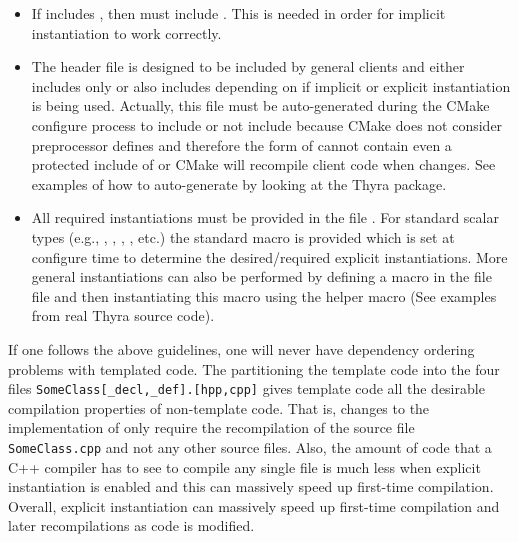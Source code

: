 \begin{itemize}
\begin{itemize}
\item If  includes
  , then  must
  include .  This is needed in order for
  implicit instantiation to work correctly.

\item The header file  is designed to be included
  by general clients and either includes only
   or also includes 
  depending on if implicit or explicit instantiation is being used.
  Actually, this file must be auto-generated during the CMake configure
  process to include or not include  because
  CMake does not consider preprocessor defines and therefore the form
  of  cannot contain even a protected include of
   or CMake will recompile client code when
   changes.  See examples of how to
  auto-generate  by looking at the Thyra package.

\item All required instantiations must be provided in the file
  .  For standard scalar types (e.g., ,
  , , ,
  etc.) the standard macro
   is
  provided which is set at configure time to determine the
  desired/required explicit instantiations.  More general
  instantiations can also be performed by defining a macro in the file
   file and then instantiating this macro
  using the helper macro
   (See
  examples from real Thyra source code).

\end{itemize}

If one follows the above guidelines, one will never have dependency
ordering problems with templated code.  The partitioning the template
code into the four files \texttt{SomeClass[\_decl,\_def].[hpp,cpp]}
gives template code all the desirable compilation properties of
non-template code.  That is, changes to the implementation of
 only require the recompilation of the source file
\texttt{SomeClass.cpp} and not any other source files.  Also, the
amount of code that a C++ compiler has to see to compile any single
 file is much less when explicit instantiation is enabled
and this can massively speed up first-time compilation.  Overall,
explicit instantiation can massively speed up first-time compilation
and later recompilations as code is modified.


\end{itemize}


